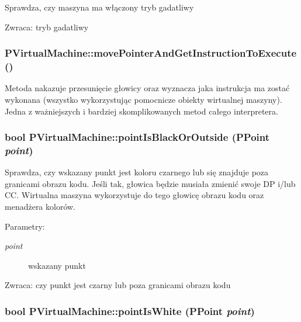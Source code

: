 Sprawdza, czy maszyna ma włączony tryb gadatliwy \begin{Desc}
\item[Zwraca:]tryb gadatliwy \end{Desc}
\hypertarget{classPVirtualMachine_29279548406a588bce03e320354cd857}{
\subsubsection[{movePointerAndGetInstructionToExecute}]{ PVirtualMachine::movePointerAndGetInstructionToExecute ()}}
\label{classPVirtualMachine_29279548406a588bce03e320354cd857}


Metoda nakazuje przesunięcie głowicy oraz wyznacza jaka instrukcja ma zostać wykonana (wszystko wykorzystując pomocnicze obiekty wirtualnej maszyny). Jedna z ważniejszych i bardziej skomplikowanych metod całego interpretera. \hypertarget{classPVirtualMachine_6daa9fea05af4bfc30b881c893fbd725}{
\subsubsection[{pointIsBlackOrOutside}]{\setlength{\rightskip}{0pt plus 5cm}bool PVirtualMachine::pointIsBlackOrOutside ({\bf PPoint} {\em point})}}
\label{classPVirtualMachine_6daa9fea05af4bfc30b881c893fbd725}


Sprawdza, czy wskazany punkt jest koloru czarnego lub się znajduje poza granicami obrazu kodu. Jeśli tak, głowica będzie musiała zmienić swoje DP i/lub CC. Wirtualna maszyna wykorzystuje do tego głowicę obrazu kodu oraz menadżera kolorów. \begin{Desc}
\item[Parametry:]
\begin{description}
\item[{\em point}]wskazany punkt \end{description}
\end{Desc}
\begin{Desc}
\item[Zwraca:]czy punkt jest czarny lub poza granicami obrazu kodu \end{Desc}
\hypertarget{classPVirtualMachine_cae537f70c35487220818e8d18978e07}{
\subsubsection[{pointIsWhite}]{\setlength{\rightskip}{0pt plus 5cm}bool PVirtualMachine::pointIsWhite ({\bf PPoint} {\em point})}}
\label{classPVirtualMachine_cae537f70c35487220818e8d18978e07}


